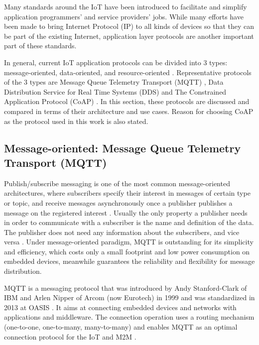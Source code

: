 Many standards around the IoT have been introduced to facilitate and simplify application programmers' and service providers' jobs. While many efforts have been made to bring Internet Protocol (IP) to all kinds of devices so that they can be part of the existing Internet, application layer protocols are another important part of these standards.

In general, current IoT application protocols can be divided into 3 types: message-oriented, data-oriented, and resource-oriented \cite{7396558}. Representative protocols of the 3 types are Message Queue Telemetry Transport (MQTT) \cite{mqtt_protocol}, Data Distribution Service for Real Time Systems (DDS) \cite{dds} and The Constrained Application Protocol (CoAP) \cite{coap_protocol}. In this section, these protocols are discussed and compared in terms of their architecture and use cases. 
Reason for choosing CoAP as the protocol used in this work is also stated. 

\subsection{Message-oriented:  Message Queue Telemetry Transport (MQTT)}
Publish/subscribe messaging is one of the most common message-oriented architectures, where subscribers specify their interest in messages of certain type or topic, and receive messages asynchronously once a publisher publishes a message on the registered interest \cite{6918928}. Usually the only property a publisher needs in order to communicate with a subscriber is the name and definition of the data. The publisher does not need any information about the subscribers, and vice versa \cite{pardo2005introduction}. Under message-oriented paradigm, MQTT is outstanding for its simplicity and efficiency, which costs only a small footprint and low power consumption on embedded devices, meanwhile guarantees the reliability and flexibility for message distribution.

MQTT is a messaging protocol that was introduced by Andy Stanford-Clark of IBM and Arlen Nipper of Arcom (now Eurotech) in 1999 and was standardized in 2013 at OASIS \cite{mqtt_protocol}. It aims at connecting embedded devices and networks with applications and middleware. The connection operation uses a routing mechanism (one-to-one, one-to-many, many-to-many) and enables MQTT as an optimal connection protocol for the IoT and M2M \cite{7123563}. 

